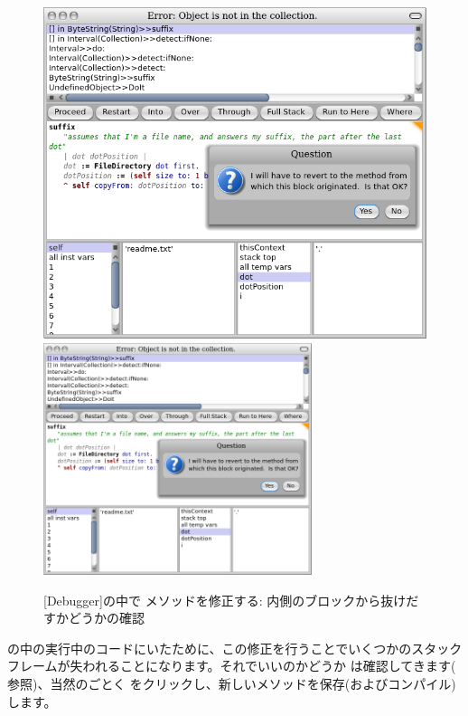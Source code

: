 \documentclass[a4paper,10pt,twoside]{book}
\begin{document}
\begin{figure}[btp]
	\begin{center}
	\ifluluelse
		{\includegraphics[width=\textwidth]{revertDialog}}
		{\includegraphics[width=0.7\textwidth]{revertDialog}}
	\end{center}
	\caption{[Debugger]の中で  メソッドを修正する: 内側のブロックから抜けだすかどうかの確認}
\end{figure}


 の中の実行中のコードにいたために、この修正を行うことでいくつかのスタックフレームが失われることになります。それでいいのかどうか \pharo は確認してきます(   参照)、当然のごとく  をクリックし、新しいメソッドを保存(およびコンパイル)します。
\end{document}

